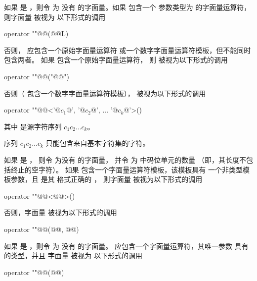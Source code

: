 \pnum
如果  是 ，则令  为
没有  的字面量。如果  包含一个
参数类型为  的字面量运算符，则字面量  被视为
以下形式的调用
\begin{codeblock}
operator ""@@(@@L)
\end{codeblock}
否则， 应包含一个原始字面量运算符
或一个数字字面量运算符模板，但不能同时包含两者。
如果  包含一个原始字面量运算符，
则   被视为以下形式的调用
\begin{codeblock}
operator ""@@("@@")
\end{codeblock}
否则（ 包含一个数字字面量运算符模板），
 被视为以下形式的调用
\begin{codeblock}
operator ""@@<'@$c_1$@', '@$c_2$@', ... '@$c_k$@'>()
\end{codeblock}
其中  是源字符序列 $c_1c_2...c_k$。
\begin{note}
序列
$c_1c_2...c_k$ 只能包含来自基本字符集的字符。
\end{note}

\pnum
如果  是 ，
则令  为没有  的字面量，
并令  为  中码位单元的数量
（即，其长度不包括终止的空字符）。
如果  包含一个字面量运算符模板，该模板具有
一个非类型模板参数，且  是其
格式正确的 ，
则字面量  被视为以下形式的调用
\begin{codeblock}
operator ""@@<@@>()
\end{codeblock}
否则，字面量  被视为以下形式的调用
\begin{codeblock}
operator ""@@(@@, @@)
\end{codeblock}

\pnum
如果  是 ，则令  为
没有  的字面量。
 应包含一个字面量运算符，其唯一参数
具有  的类型，并且
字面量  被视为
以下形式的调用
\begin{codeblock}
operator ""@@(@@)
\end{codeblock}

